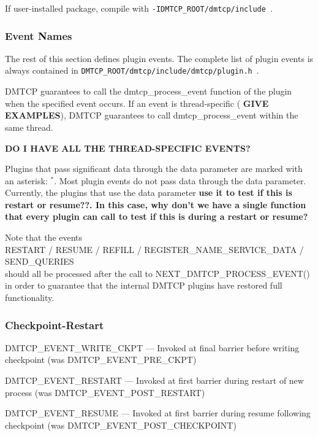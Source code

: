 \documentclass{article}
\begin{document}
If user-installed package, compile with {\tt -IDMTCP\_ROOT/dmtcp/include}~.

\subsubsection{Event Names}

The rest of this section defines plugin events.
The complete list of plugin events is always contained in
{\tt DMTCP\_ROOT/dmtcp/include/dmtcp/plugin.h}~.

DMTCP guarantees to call the dmtcp\_process\_event function of the plugin
when the specified event occurs.  
If an event is thread-specific ({\bf
GIVE EXAMPLES}), DMTCP guarantees to call dmtcp\_process\_event within
the same thread.

{\bf DO I HAVE ALL THE THREAD-SPECIFIC EVENTS?}

Plugins that pass significant data through the data parameter
are marked with an asterisk: {}$^*$.  
Most plugin events do not pass data through the data parameter.  
Currently, the plugins
that use the data parameter {\bf use it to test if this is restart or resume??.
In this case, why don't we have a single function that every plugin can call
to test if this is during a restart or resume?}

Note that the events \\
   RESTART / RESUME / REFILL / REGISTER\_NAME\_SERVICE\_DATA / SEND\_QUERIES \\
should all be processed after the call to NEXT\_DMTCP\_PROCESS\_EVENT() in 
order to guarantee that the internal DMTCP plugins have restored full
functionality.

\itemsep0pt
\subsubsection*{Checkpoint-Restart}
\begin{list}{}{\leftmargin=3em \itemindent=-2em}
\item
  DMTCP\_EVENT\_WRITE\_CKPT --- Invoked at final barrier before writing checkpoint
(was DMTCP\_EVENT\_PRE\_CKPT)
\item
  DMTCP\_EVENT\_RESTART --- Invoked at first barrier during restart of new process
(was DMTCP\_EVENT\_POST\_RESTART)
\item
  DMTCP\_EVENT\_RESUME --- Invoked at first barrier during resume following checkpoint
(was DMTCP\_EVENT\_POST\_CHECKPOINT)
\end{list}
\end{document}
